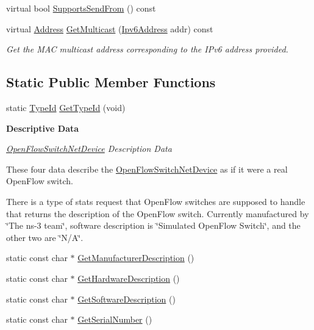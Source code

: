 \begin{DoxyCompactItemize}
\item 
virtual bool \hyperlink{classns3_1_1OpenFlowSwitchNetDevice_abfebbe48743d45631308dc11d45bb6f4}{Supports\+Send\+From} () const 
\item 
virtual \hyperlink{classns3_1_1Address}{Address} \hyperlink{classns3_1_1OpenFlowSwitchNetDevice_a716719d59dbef8d0c1d67e24f566e97d}{Get\+Multicast} (\hyperlink{classns3_1_1Ipv6Address}{Ipv6\+Address} addr) const 
\begin{DoxyCompactList}\small\item\em Get the M\+AC multicast address corresponding to the I\+Pv6 address provided. \end{DoxyCompactList}\end{DoxyCompactItemize}
\subsection*{Static Public Member Functions}
\begin{DoxyCompactItemize}
\item 
static \hyperlink{classns3_1_1TypeId}{Type\+Id} \hyperlink{classns3_1_1OpenFlowSwitchNetDevice_a8ff59624a100b3e8ed151abd5608eae3}{Get\+Type\+Id} (void)
\end{DoxyCompactItemize}
\begin{Indent}{\bf Descriptive Data}\par
{\em \hyperlink{classns3_1_1OpenFlowSwitchNetDevice}{Open\+Flow\+Switch\+Net\+Device} Description Data

These four data describe the \hyperlink{classns3_1_1OpenFlowSwitchNetDevice}{Open\+Flow\+Switch\+Net\+Device} as if it were a real Open\+Flow switch.

There is a type of stats request that Open\+Flow switches are supposed to handle that returns the description of the Open\+Flow switch. Currently manufactured by \char`\"{}\+The ns-\/3 team\char`\"{}, software description is \char`\"{}\+Simulated
\+Open\+Flow Switch\char`\"{}, and the other two are \char`\"{}\+N/\+A\char`\"{}. }\begin{DoxyCompactItemize}
\item 
static const char $\ast$ \hyperlink{classns3_1_1OpenFlowSwitchNetDevice_a638da8e6857627b2c0906a7deca75898}{Get\+Manufacturer\+Description} ()
\item 
static const char $\ast$ \hyperlink{classns3_1_1OpenFlowSwitchNetDevice_a7dabcd6f04c8c075e24d29035b212495}{Get\+Hardware\+Description} ()
\item 
static const char $\ast$ \hyperlink{classns3_1_1OpenFlowSwitchNetDevice_a5ab9d00840f1d3eef81df4b6dce3e04c}{Get\+Software\+Description} ()
\item 
static const char $\ast$ \hyperlink{classns3_1_1OpenFlowSwitchNetDevice_a34af530cb2bc951796dcb3c586685538}{Get\+Serial\+Number} ()
\end{DoxyCompactItemize}
\end{Indent}
